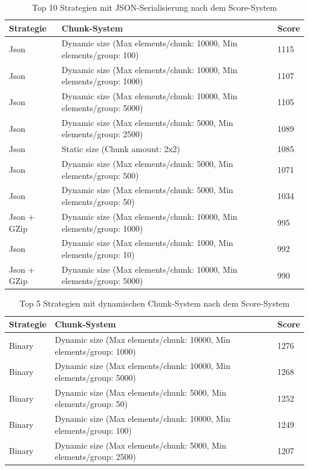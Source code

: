 \begin{table}[htp]
    \centering
    \caption{Top 10 Strategien mit JSON-Serialisierung nach dem Score-System}
    \begin{tabular}{|l|l|l|}
    \hline
        Strategie & Chunk-System & Score \\
        \hline
        Json & Dynamic size (Max elements/chunk: 10000, Min elements/group: 100) & 1115\\
        Json & Dynamic size (Max elements/chunk: 10000, Min elements/group: 1000) & 1107\\
        Json & Dynamic size (Max elements/chunk: 10000, Min elements/group: 5000) & 1105\\
        Json & Dynamic size (Max elements/chunk: 5000, Min elements/group: 2500) & 1089\\
        Json & Static size (Chunk amount: 2x2) & 1085\\
        Json & Dynamic size (Max elements/chunk: 5000, Min elements/group: 500) & 1071\\
        Json & Dynamic size (Max elements/chunk: 5000, Min elements/group: 50) & 1034\\
        Json + GZip & Dynamic size (Max elements/chunk: 10000, Min elements/group: 1000) & 995\\
        Json & Dynamic size (Max elements/chunk: 1000, Min elements/group: 10) & 992\\
        Json + GZip & Dynamic size (Max elements/chunk: 10000, Min elements/group: 5000) & 990\\
        \hline
    \end{tabular}
    \label{tbl:topStratBin}
\end{table}

\begin{table}[htp]
    \centering
    \caption{Top 5 Strategien mit dynamischen Chunk-System nach dem Score-System}
    \begin{tabular}{|l|l|l|}
    \hline
        Strategie & Chunk-System & Score \\
        \hline
        Binary & Dynamic size (Max elements/chunk: 10000, Min elements/group: 1000) & 1276\\
        Binary & Dynamic size (Max elements/chunk: 10000, Min elements/group: 5000) & 1268\\
        Binary & Dynamic size (Max elements/chunk: 5000, Min elements/group: 50) & 1252\\
        Binary & Dynamic size (Max elements/chunk: 10000, Min elements/group: 100) & 1249\\
        Binary & Dynamic size (Max elements/chunk: 5000, Min elements/group: 2500) & 1207\\
        \hline
    \end{tabular}
    \label{tbl:topDynamic}
\end{table}

